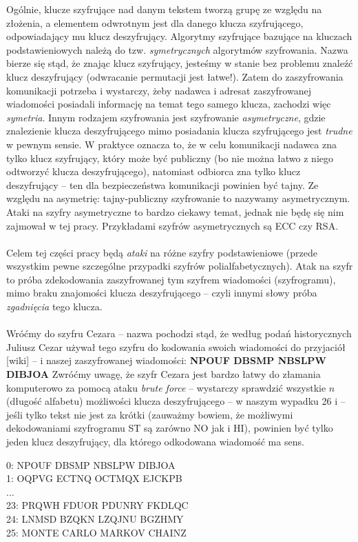\documentclass[a4paper]{article}
\begin{document}
Ogólnie, klucze szyfrujące nad danym tekstem tworzą grupę ze względu na złożenia, a elementem odwrotnym jest dla danego klucza szyfrującego, odpowiadający mu klucz deszyfrujący. Algorytmy szyfrujące bazujące na kluczach podstawieniowych należą do tzw. \textit{symetrycznych} algorytmów szyfrowania. Nazwa bierze się stąd, że znając klucz szyfrujący, jesteśmy w stanie bez problemu znaleźć klucz deszyfrujący (odwracanie permutacji jest łatwe!). Zatem do zaszyfrowania komunikacji potrzeba i wystarczy, żeby nadawca i adresat zaszyfrowanej wiadomości posiadali informację na temat tego samego klucza, zachodzi więc \textit{symetria}. Innym rodzajem szyfrowania jest szyfrowanie \textit{asymetryczne}, gdzie znalezienie klucza deszyfrującego mimo posiadania klucza szyfrującego jest \textit{trudne} w pewnym sensie. W praktyce oznacza to, że w celu komunikacji nadawca zna tylko klucz szyfrujący, który może być publiczny (bo nie można łatwo z niego odtworzyć klucza deszyfrującego), natomiast odbiorca zna tylko klucz deszyfrujący – ten dla bezpieczeństwa komunikacji powinien być tajny. Ze względu na asymetrię: tajny-publiczny szyfrowanie to nazywamy asymetrycznym. Ataki na szyfry asymetryczne to bardzo ciekawy temat, jednak nie będę się nim zajmował w tej pracy. Przykładami szyfrów asymetrycznych są ECC czy RSA.
\\\\
Celem tej części pracy będą \textit{ataki} na różne szyfry podstawieniowe (przede wszystkim pewne szczególne przypadki szyfrów polialfabetycznych). Atak na szyfr to próba zdekodowania zaszyfrowanej tym szyfrem wiadomości (szyfrogramu), mimo braku znajomości klucza deszyfrującego – czyli innymi słowy próba \textit{zgadnięcia} tego klucza.
\\\\
Wróćmy do szyfru Cezara – nazwa pochodzi stąd, że według podań historycznych Juliusz Cezar używał tego szyfru do kodowania swoich wiadomości do przyjaciół [wiki] – i naszej zaszyfrowanej wiadomości: \textbf{NPOUF DBSMP NBSLPW DIBJOA} Zwróćmy uwagę, że szyfr Cezara jest bardzo łatwy do złamania komputerowo za pomocą ataku \textit{brute force} – wystarczy sprawdzić wszystkie $n$ (długość alfabetu) możliwości klucza deszyfrującego – w naszym wypadku 26 i – jeśli tylko tekst nie jest za krótki (zauważmy bowiem, że możliwymi dekodowaniami szyfrogramu ST są zarówno NO jak i HI), powinien być tylko jeden klucz deszyfrujący, dla którego odkodowana wiadomość ma sens.
\begin{center}
0:  NPOUF DBSMP NBSLPW DIBJOA \\
1:  OQPVG ECTNQ OCTMQX EJCKPB \\
...
\\
23: PRQWH FDUOR PDUNRY FKDLQC \\
24: LNMSD BZQKN LZQJNU BGZHMY \\
25: MONTE CARLO MARKOV CHAINZ \\
\end{center}
\end{document}
